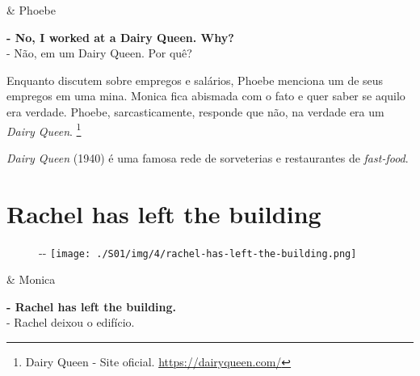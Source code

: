 \begin{tcolorbox}[enhanced,center upper,
    drop fuzzy shadow southeast, boxrule=0.3pt,
    lower separated=false, breakable,
    colframe=black!30!dialogoBorder,colback=white]
\medskip
\begin{minipage}[c]{0.16\linewidth}
   & \centering \scriptsize{Phoebe}
\end{minipage}
\hfill
\begin{minipage}[c]{0.8\linewidth}
  \textbf{- No, I worked at a Dairy Queen. Why?}\\
  - Não, em um Dairy Queen. Por quê?
\end{minipage}
\end{tcolorbox}

Enquanto discutem sobre empregos e salários, Phoebe menciona um de seus
empregos em uma mina. Monica fica abismada com o fato e quer saber se
aquilo era verdade. Phoebe, sarcasticamente, responde que não, na
verdade era um \emph{Dairy Queen}. \footnote{\sloppy Dairy Queen - Site oficial. \url{https://dairyqueen.com/}}

\emph{Dairy Queen} (1940) é uma famosa rede de sorveterias e
restaurantes de \emph{fast-food}.

\hypertarget{rachel-has-left-the-building}{%
\section{Rachel has left the
building}\label{rachel-has-left-the-building}}

\begin{figure}[!ht]
  \begin{adjustwidth}{-\oddsidemargin-1in}{-\rightmargin}
    \centering
    \texttt{[image: ./S01/img/4/rachel-has-left-the-building.png]}
  \end{adjustwidth}
\end{figure}

\begin{tcolorbox}[enhanced,center upper,
    drop fuzzy shadow southeast, boxrule=0.3pt,
    lower separated=false,
    colframe=black!30!dialogoBorder,colback=white]
\begin{minipage}[c]{0.16\linewidth}
   & \centering \scriptsize{Monica}
\end{minipage}
\hfill
\begin{minipage}[c]{0.8\linewidth}
  \textbf{- Rachel has left the building.}\\
  - Rachel deixou o edifício.
\end{minipage}
\end{tcolorbox}

